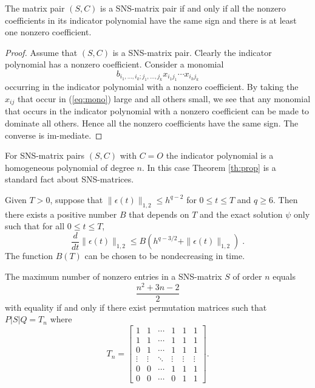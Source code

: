 \documentclass[slovensky]{svk}
\begin{document}
\begin{theorem} 
\label{th:prop} 
The matrix pair $(S,C)$ is a {\rm SNS}-matrix pair if and
only if all the nonzero coefficients in its indicator
polynomial have the same sign and there is at least one
nonzero coefficient.
\end{theorem} 
 
\begin{proof}
Assume that $(S,C)$ is a SNS-matrix pair.  Clearly the
indicator polynomial has a nonzero coefficient.  Consider a
monomial
\begin{equation} 
\label{eq:mono} 
b_{i_{1},\ldots,i_{k};j_{1},\ldots,j_{k}}x_{i_{1}j_{1}}\cdots
x_{i_{k}j_{k}}
\end{equation} 
occurring in the indicator polynomial with a nonzero
coefficient.  By taking the $x_{ij}$ that occur in
(\ref{eq:mono}) large and all others small, we see that any
monomial that occurs in the indicator polynomial with a
nonzero coefficient can be made to dominate all others.
Hence all the nonzero coefficients have the same sign. The
converse is im-\linebreak mediate. \qquad\end{proof} 
 

For SNS-matrix pairs $(S,C)$ with $C=O$ the indicator
polynomial is a homogeneous polynomial of degree $n$. In
this case Theorem \ref{th:prop} is a standard fact about
SNS-matrices.
 
\begin{lemma}[{\rm Stability}]
\label{stability}
Given $T>0$, suppose that $\| \epsilon (t) \|_{1,2} \leq h^{q-2}$
for $0 \leq t \leq T$ and $q \geq 6$. 
Then there exists a positive number $B$ that depends on
$T$ and the exact solution $\psi$ only such that for all $0 \leq t \leq T$,
\begin{equation}
\label{Gron}
\frac {d}{dt} \| \epsilon (t) \| _{1,2}  \leq B
   ( h^{q-3/2} + \| \epsilon (t) \|_{1,2})\;.
\end{equation}
The function $B(T)$ can be chosen to be nondecreasing in time.
\end{lemma}
 
 
\begin{theorem} 
\label{th:gibson} 
The maximum number of nonzero entries in a {\rm SNS}-matrix
$S$ of order $n$ equals \[\frac{n^{2}+3n-2}{2}\] with
equality if and only if there exist permutation matrices
such that $P|S|Q=T_{n}$ where
\begin{equation} 
\label{eq:gibson} 
T_{n}=\left[\begin{array}{cccccc} 1&1&\cdots&1&1&1\\
1&1&\cdots&1&1&1\\ 0&1&\cdots&1&1&1\\ 
\vdots&\vdots&\ddots&\vdots&\vdots&\vdots\\ 
0&0&\cdots&1&1&1\\ 0&0&\cdots&0&1&1\end{array}\right]. 
\end{equation} 
\end{theorem} 
 
\end{document}
